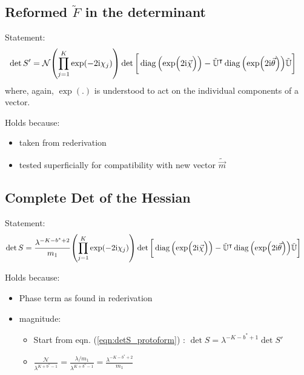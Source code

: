 \documentclass[
	english,
	a4paper,
	fontsize=10pt,
	parskip=half,
	titlepage=true,
	DIV=12,
	final
]{scrreprt}
\newcommand*{\transp}{\ensuremath{^\intercal}}
\newcommand*{\iunit}{\ensuremath{\mathrm{i}}}
\DeclareMathOperator{\diag}{diag}
\begin{document}
\subsection{Reformed $\tilde{F}$ in the determinant}
Statement:
\begin{align}
	\det S'
&=
	\mathcal{N}
	\qty( \prod_{j=1}^{K} \exp(-2\iunit \chi_j) )
	\det\qty[\bigg.
		\diag\qty(\exp(\Big.2\iunit\vec{\chi}))
		-
		\tilde{\mathbb{U}}\transp
		\diag\qty(\exp(2\iunit\vec{\theta}))
		\tilde{\mathbb{U}}
	]
\end{align}
where, again, $\exp(.)$ is understood to act on the individual components of a vector.

Holds because:
\begin{itemize}
\item taken from rederivation
\item tested superficially for compatibility with new vector $\tilde{\vec{m}}$
\end{itemize}

\subsection{Complete Det of the Hessian}
Statement:
\begin{align}
	\det S
&=
	\frac{ \lambda^{-K - b^* + 2} }{ m_1 }
	\qty( \prod_{j=1}^{K} \exp(-2\iunit \chi_j) )
	\det\qty[\bigg.
		\diag\qty(\exp(\Big.2\iunit\vec{\chi}))
		-
		\tilde{\mathbb{U}}\transp
		\diag\qty(\exp(2\iunit\vec{\theta}))
		\tilde{\mathbb{U}}
	]
\label{eqn:detComplete}
\end{align}

Holds because:
\begin{itemize}
\item Phase term as found in rederivation
\item magnitude:
	\begin{itemize}
	\item Start from eqn. (\ref{eqn:detS_protoform}) : $\det S = \lambda^{-K - b^* + 1} \det S'$
	\item $
	\frac
		{\mathcal{N}}
		{\lambda^{K + b^* - 1}}
=
	\frac
		{\lambda / m_1}
		{\lambda^{K + b^* - 1}}
=
	\frac{\lambda^{- K - b^* + 2}}{m_1}
$	
	\end{itemize}
\end{itemize}
\end{document}
